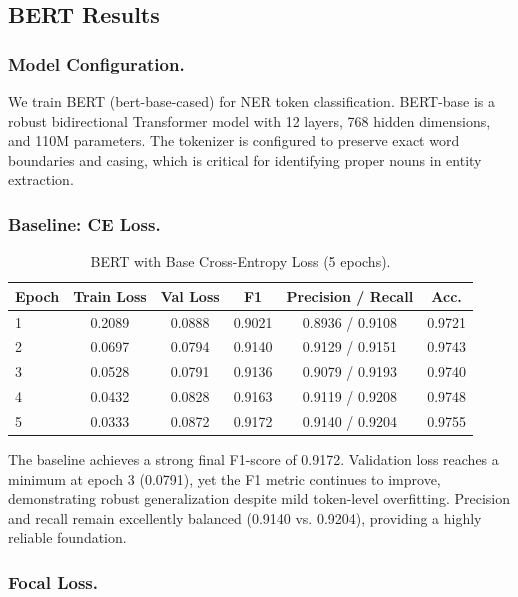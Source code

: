\subsection{BERT Results}

\subsubsection{Model Configuration.}
We train BERT (bert-base-cased) for NER token classification. BERT-base is a robust bidirectional Transformer model with 12 layers, 768 hidden dimensions, and 110M parameters. The tokenizer is configured to preserve exact word boundaries and casing, which is critical for identifying proper nouns in entity extraction.

\subsubsection{Baseline: CE Loss.}

\begin{table}[htbp]
    \centering
    \begin{tabular}{l c c c c c}
        \hline
        \textbf{Epoch} & \textbf{Train Loss} & \textbf{Val Loss} & \textbf{F1} & \textbf{Precision / Recall} & \textbf{Acc.} \\
        \hline
        1 & 0.2089 & 0.0888 & 0.9021 & 0.8936 / 0.9108 & 0.9721 \\
        2 & 0.0697 & 0.0794 & 0.9140 & 0.9129 / 0.9151 & 0.9743 \\
        3 & 0.0528 & 0.0791 & 0.9136 & 0.9079 / 0.9193 & 0.9740 \\
        4 & 0.0432 & 0.0828 & 0.9163 & 0.9119 / 0.9208 & 0.9748 \\
        5 & 0.0333 & 0.0872 & 0.9172 & 0.9140 / 0.9204 & 0.9755 \\
        \hline
    \end{tabular}
    \caption{BERT with Base Cross-Entropy Loss (5 epochs).}
    \label{tab:bert_base_ce}
\end{table}

\noindent The baseline achieves a strong final F1-score of 0.9172. Validation loss reaches a minimum at epoch 3 (0.0791), yet the F1 metric continues to improve, demonstrating robust generalization despite mild token-level overfitting. Precision and recall remain excellently balanced (0.9140 vs. 0.9204), providing a highly reliable foundation.

\subsubsection{Focal Loss.}

